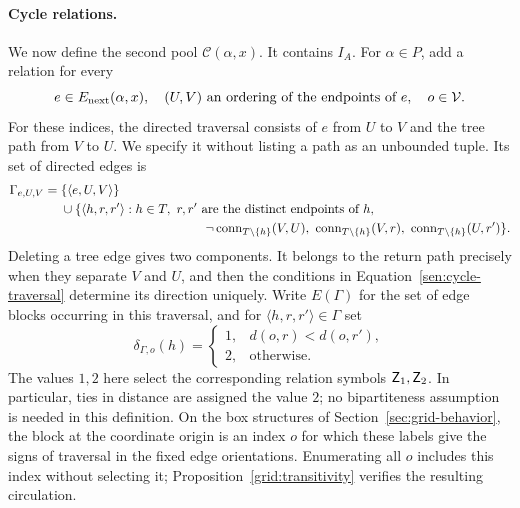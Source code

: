 \paragraph{Cycle relations.}
We now define the second pool \(\mathcal C(\alpha,x)\). It contains
\(I_A\). For \(\alpha\in P\), add a relation for every
\[
 e\in E_{\rm next}(\alpha,x),\quad
 (U,V)\text{ an ordering of the endpoints of }e,\quad
 o\in\mathcal V.
\]
For these indices, the directed traversal consists of \(e\) from \(U\)
to \(V\) and the tree path from \(V\) to \(U\). We specify it without
listing a path as an unbounded tuple. Its set of directed edges is
\begin{align}
 \Gamma_{e,U,V}={}&\{\langle e,U,V\rangle\}\notag\\
 &{}\cup
 \{\langle h,r,r'\rangle:
 h\in T,\ r,r'\text{ are the distinct endpoints of }h,\notag\\
 &\hspace{40mm}
 \neg\operatorname{conn}_{T\setminus\{h\}}(V,U),\
 \operatorname{conn}_{T\setminus\{h\}}(V,r),\
 \operatorname{conn}_{T\setminus\{h\}}(U,r')\}.
 \label{sen:cycle-traversal}
\end{align}
Deleting a tree edge gives two components. It belongs to the return
path precisely when they separate \(V\) and \(U\), and then the
conditions in Equation~\eqref{sen:cycle-traversal} determine its
direction uniquely. Write \(E(\Gamma)\) for the set of edge blocks
occurring in this traversal, and for
\(\langle h,r,r'\rangle\in\Gamma\) set
\[
 \delta_{\Gamma,o}(h)=
 \begin{cases}
  1,&d(o,r)<d(o,r'),\\
  2,&\text{otherwise}.
 \end{cases}
\]
The values \(1,2\) here select the corresponding relation symbols
\(\mathsf Z_1,\mathsf Z_2\). In particular, ties in distance are assigned
the value \(2\); no bipartiteness assumption is needed in this definition.
On the box structures of Section~\ref{sec:grid-behavior}, the block at
the coordinate origin is an index \(o\) for which these labels give the
signs of traversal in the fixed edge orientations. Enumerating all
\(o\) includes this index without selecting it;
Proposition~\ref{grid:transitivity} verifies the resulting circulation.

